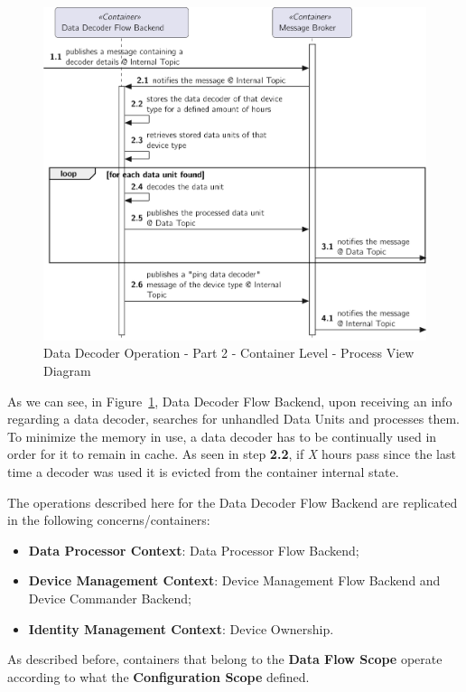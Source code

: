 \begin{figure}[H]
   \centering
   \includegraphics[page=1,width=0.8\columnwidth]{assets/diagrams/design/architectural/level2/process/data-decoder-flow-2.pdf}
   \caption[Data Decoder Operation - Part 2 - Container Level - Process View Diagram]{Data Decoder Operation - Part 2 - Container Level - Process View Diagram}
   \label{fig:design:architecture:platform:container:process:diagram:decoder:2}
\end{figure}

As we can see, in Figure~\ref{fig:design:architecture:platform:container:process:diagram:decoder:2}, Data Decoder Flow Backend, upon receiving an info regarding a data decoder, searches for unhandled Data Units and processes them.
To minimize the memory in use, a data decoder has to be continually used in order for it to remain in cache. As seen in step \textbf{2.2}, if \textit{X} hours pass since the last time a decoder was used it is evicted from the container internal state.

The operations described here for the Data Decoder Flow Backend are replicated in the following concerns/containers:

\begin{itemize}
   \item \textbf{Data Processor Context}: Data Processor Flow Backend;
   \item \textbf{Device Management Context}: Device Management Flow Backend and Device Commander Backend;
   \item \textbf{Identity Management Context}: Device Ownership.
\end{itemize}

As described before, containers that belong to the \textbf{Data Flow Scope} operate according to what the \textbf{Configuration Scope} defined.

